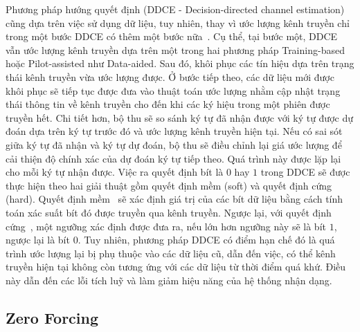 Phương pháp hướng quyết định (DDCE - Decision-directed channel estimation) cũng dựa trên việc sử dụng dữ liệu, tuy nhiên, thay vì ước lượng kênh truyền chỉ trong một bước DDCE có thêm một bước nữa~\cite{vilas2022}. Cụ thể, tại bước một, DDCE vẫn ước lượng kênh truyền dựa trên một trong hai phương pháp Training-based hoặc Pilot-assisted như Data-aided. Sau đó, khôi phục các tín hiệu dựa trên trạng thái kênh truyền vừa ước lượng được. Ở bước tiếp theo, các dữ liệu mới được khôi phục sẽ tiếp tục được đưa vào thuật toán ước lượng nhằm cập nhật trạng thái thông tin về kênh truyền cho đến khi các ký hiệu trong một phiên được truyền hết. Chi tiết hơn, bộ thu sẽ so sánh ký tự đã nhận được với ký tự được dự đoán dựa trên ký tự trước đó và ước lượng kênh truyền hiện tại. Nếu có sai sót giữa ký tự đã nhận và ký tự dự đoán, bộ thu sẽ điều chỉnh lại giá ước lượng để cải thiện độ chính xác của dự đoán ký tự tiếp theo. Quá trình này được lặp lại cho mỗi ký tự nhận được. Việc ra quyết định bít là $0$ hay $1$ trong DDCE sẽ được thực hiện theo hai giải thuật gồm quyết định mềm (soft) và quyết định cứng (hard). Quyết định mềm~\cite{Park2015} sẽ xác định giá trị của các bít dữ liệu bằng cách tính toán xác suất bít đó được truyền qua kênh truyền. Ngược lại, với quyết định cứng~\cite{Kai2005}, một ngưỡng xác định được đưa ra, nếu lớn hơn ngưỡng này sẽ là bít $1$, ngược lại là bít $0$. Tuy nhiên, phương pháp DDCE có điểm hạn chế đó là quá trình ước lượng lại bị phụ thuộc vào các dữ liệu cũ, dẫn đến việc, có thể kênh truyền hiện tại không còn tương ứng với các dữ liệu từ thời điểm quá khứ. Điều này dẫn đến các lỗi tích luỹ và làm giảm hiệu năng của hệ thống nhận dạng.

\subsection{Zero Forcing} \label{sec:zf}

